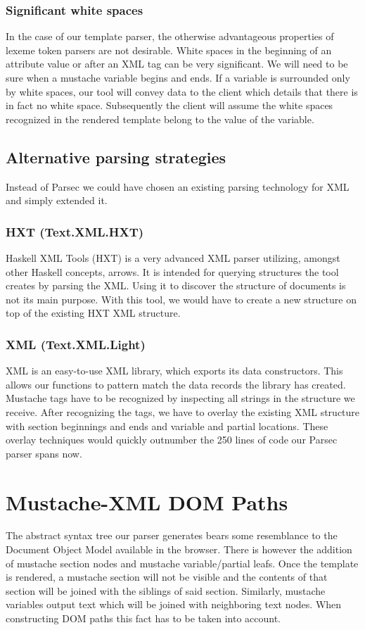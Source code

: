 \documentclass[thesis.tex]{subfiles}
\begin{document}
\subsubsection{Significant white spaces}
In the case of our template parser, the otherwise advantageous properties
of lexeme token parsers are not desirable.
White spaces in the beginning of an attribute value or after an XML tag can be
very significant.
We will need to be sure when a mustache variable begins and ends.
If a variable is surrounded only by white spaces, our tool will convey
data to the client which details that there is in fact no white space.
Subsequently the client will assume the white spaces recognized in the
rendered template belong to the value of the variable.

\subsection{Alternative parsing strategies}
Instead of Parsec we could have chosen an existing parsing technology for XML
and simply extended it.

\subsubsection{HXT (Text.XML.HXT)}
Haskell XML Tools (HXT) is a very advanced XML parser utilizing, amongst other
Haskell concepts, arrows. It is intended for querying structures the
tool creates by parsing the XML. Using it to discover the structure
of documents is not its main purpose. With this tool, we would have to create a
new structure on top of the existing HXT XML structure.

\subsubsection{XML (Text.XML.Light)}
XML is an easy-to-use XML library, which exports its data constructors.
This allows our functions to pattern match the data records the library has
created.
Mustache tags have to be recognized by inspecting all strings in the
structure we receive. After recognizing the tags, we have to overlay the
existing XML structure with section beginnings and ends and variable and partial
locations.
These overlay techniques would quickly outnumber the 250 lines of code our
Parsec parser spans now.

\section{Mustache-XML DOM Paths}
\label{sec:paths}
The abstract syntax tree our parser generates bears some resemblance to the
Document Object Model available in the browser. There is however the addition of
mustache section nodes and mustache variable/partial leafs.
Once the template is rendered, a mustache section will not be visible and the
contents of that section will be joined with the siblings of said section.
Similarly, mustache variables output text which will be joined with neighboring
text nodes. When constructing DOM paths this fact has to be taken into account.
\end{document}
